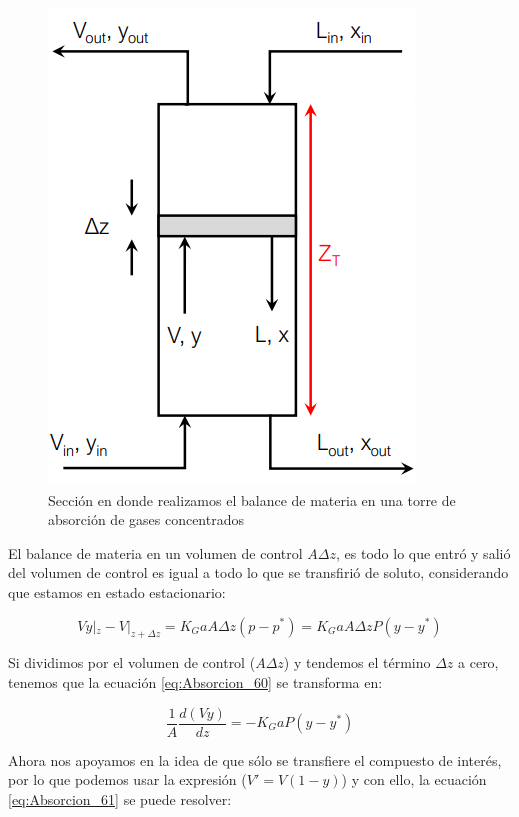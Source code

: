 \documentclass[11pt]{book}
\begin{document}
\begin{figure}
    \centering
    \includegraphics{img/absorcion/Absorcion_14.PNG}
    \caption{Sección en donde realizamos el balance de materia en una torre de absorción de gases concentrados}
    \label{fig:Absorcion_14}
\end{figure}

El balance de materia en un volumen de control $A\Delta z$, es todo lo que entró y salió del volumen de control es igual a todo lo que se transfirió de soluto, considerando que estamos en estado estacionario:

\begin{equation}
    \label{eq:Absorcion_60}
    V y|_z - V|_{z+\Delta z} = K_G a A \Delta z (p-p^*) =K_G a A \Delta z P (y-y^*)
\end{equation}

Si dividimos por el volumen de control ($A\Delta z$) y tendemos el término $\Delta z$ a cero, tenemos que la ecuación \ref{eq:Absorcion_60} se transforma en:

\begin{equation}
    \label{eq:Absorcion_61}
    \frac{1}{A} \frac{d (V y)}{dz} = -K_G a P (y-y^*)
\end{equation}

Ahora nos apoyamos en la idea de que sólo se transfiere el compuesto de interés, por lo que podemos usar la expresión ($V' = V (1-y)$) y con ello, la ecuación \ref{eq:Absorcion_61} se puede resolver:
\end{document}
